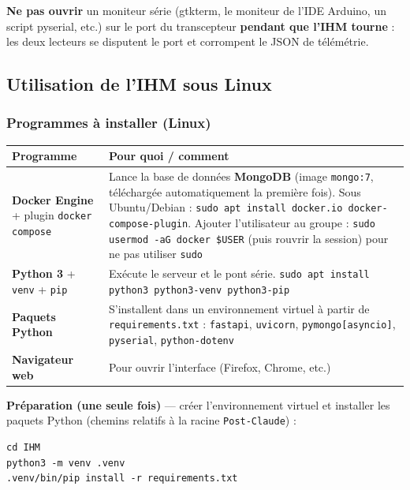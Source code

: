\documentclass[12pt,a4paper]{article}
\newcommand{\file}[1]{\texttt{#1}}
\begin{document}
\begin{warningbox}
  \textbf{Ne pas ouvrir} un moniteur s\'erie (gtkterm, le moniteur de l'IDE Arduino,
  un script pyserial, etc.) sur le port du transcepteur \textbf{pendant que l'IHM
  tourne} : les deux lecteurs se disputent le port et corrompent le JSON de
  t\'el\'em\'etrie.
\end{warningbox}

\subsection{Utilisation de l'IHM sous Linux}

\subsubsection{Programmes à installer (Linux)}

\begin{longtable}{L{4.2cm} L{8.8cm}}
  \toprule
  \textcolor{tableheadfg}{\textbf{Programme}} &
  \textcolor{tableheadfg}{\textbf{Pour quoi / comment}} \\
  \midrule
  \endhead
  \bottomrule
  \endfoot
  \textbf{Docker Engine} + plugin \texttt{docker compose} & Lance la base de
    donn\'ees \textbf{MongoDB} (image \texttt{mongo:7}, t\'el\'echarg\'ee
    automatiquement la premi\`ere fois). Sous Ubuntu/Debian :
    \texttt{sudo apt install docker.io docker-compose-plugin}. Ajouter l'utilisateur
    au groupe : \texttt{sudo usermod -aG docker \$USER} (puis rouvrir la session)
    pour ne pas utiliser \texttt{sudo} \\[3pt]
  \textbf{Python 3} + \texttt{venv} + \texttt{pip} & Ex\'ecute le serveur et le pont
    s\'erie. \texttt{sudo apt install python3 python3-venv python3-pip} \\[3pt]
  \textbf{Paquets Python} & S'installent dans un environnement virtuel à partir de
    \file{requirements.txt} : \texttt{fastapi}, \texttt{uvicorn},
    \texttt{pymongo[asyncio]}, \texttt{pyserial}, \texttt{python-dotenv} \\[3pt]
  \textbf{Navigateur web} & Pour ouvrir l'interface (Firefox, Chrome, etc.) \\
\end{longtable}

\textbf{Pr\'eparation (une seule fois)} --- cr\'eer l'environnement virtuel et
installer les paquets Python (chemins relatifs à la racine \file{Post-Claude}) :

\begin{lstlisting}[style=shell, caption={Installation initiale de l'IHM sous Linux}]
cd IHM
python3 -m venv .venv
.venv/bin/pip install -r requirements.txt
\end{lstlisting}
\end{document}

